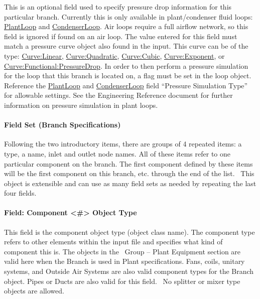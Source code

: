 This is an optional field used to specify pressure drop information for this particular branch. Currently this is only available in plant/condenser fluid loops: \hyperref[plantloop]{PlantLoop} and \hyperref[condenserloop]{CondenserLoop}. Air loops require a full airflow network, so this field is ignored if found on an air loop. The value entered for this field must match a pressure curve object also found in the input. This curve can be of the type: \hyperref[curvelinear]{Curve:Linear}, \hyperref[curvequadratic]{Curve:Quadratic}, \hyperref[curvecubic]{Curve:Cubic}, \hyperref[curveexponent]{Curve:Exponent}, or \hyperref[curvefunctionalpressuredrop]{Curve:Functional:PressureDrop}. In order to then perform a pressure simulation for the loop that this branch is located on, a flag must be set in the loop object. Reference the \hyperref[plantloop]{PlantLoop} and \hyperref[condenserloop]{CondenserLoop} field ``Pressure Simulation Type'' for allowable settings. See the Engineering Reference document for further information on pressure simulation in plant loops.

\paragraph{Field Set (Branch Specifications)}\label{field-set-branch-specifications}

Following the two introductory items, there are groups of 4 repeated items: a type, a name, inlet and outlet node names. All of these items refer to one particular component on the branch. The first component defined by these items will be the first component on this branch, etc. through the end of the list.~ This object is extensible and can use as many field sets as needed by repeating the last four fields.

\paragraph{Field: Component \textless{}\#\textgreater{} Object Type}\label{field-component-object-type-000}

This field is the component object type (object class name). The component type refers to other elements within the input file and specifies what kind of component this is. The objects in the~ Group -- Plant Equipment section are valid here when the Branch is used in Plant specifications. Fans, coils, unitary systems, and Outside Air Systems are also valid component types for the Branch object. Pipes or Ducts are also valid for this field.~ No splitter or mixer type objects are allowed.

